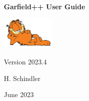 \begin{titlepage}
  {
  \centering
  \sffamily
  \linespread{1.5}

  \vspace{3cm} 

  \huge{\textbf{Garfield++ User Guide}}

  \vspace{2cm}

  \includegraphics[width=0.2\textwidth]{garfield.jpg}

  \vspace{2cm}

  \large
  Version 2023.4

  \vspace{2cm}
  \large
  H. Schindler

  \vfill

  June 2023

  }
\end{titlepage}

